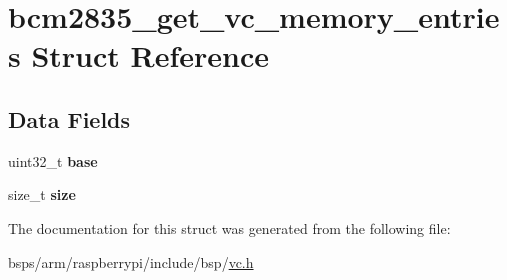 \hypertarget{structbcm2835__get__vc__memory__entries}{}\section{bcm2835\+\_\+get\+\_\+vc\+\_\+memory\+\_\+entries Struct Reference}
\label{structbcm2835__get__vc__memory__entries}
\subsection*{Data Fields}
\begin{DoxyCompactItemize}
\item 
\mbox{\label{structbcm2835__get__vc__memory__entries_a308ac000a7e11f888d359a2c0b0688ca}} 
uint32\+\_\+t {\bfseries base}
\item 
\mbox{\label{structbcm2835__get__vc__memory__entries_a7309f4fa1107cc6602d2310175885bb1}} 
size\+\_\+t {\bfseries size}
\end{DoxyCompactItemize}


The documentation for this struct was generated from the following file\+:\begin{DoxyCompactItemize}
\item 
bsps/arm/raspberrypi/include/bsp/\mbox{\hyperlink{vc_8h}{vc.\+h}}\end{DoxyCompactItemize}
